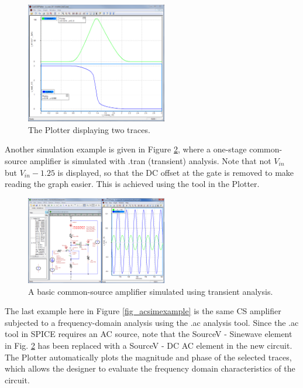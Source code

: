 \begin{figure}
    \includegraphics[width=0.55\textwidth]{./figures/getting_started_figures/Plotter_twotraces.png}
    \caption{The Plotter displaying two traces.}
  \label{fig_plotter_bothtraces}
\end{figure} 

Another simulation example is given in Figure \ref{fig_transientsimexample}, where a one-stage common-source amplifier is simulated with \textsf{.tran} (transient) analysis.  Note that not $V_{in}$ but $V_{in}-1.25$ is displayed, so that the DC offset at the gate is removed to make reading the graph easier.  This is achieved using the  tool in the Plotter.

\begin{figure}[hbt]
\centering
  \includegraphics[width=0.55\textwidth]
	{./figures/getting_started_figures/CoolSPICE_examplesimulation_transient.png}
  \caption{A basic common-source amplifier simulated using transient analysis.}
  \label{fig_transientsimexample}
\end{figure}

The last example here in Figure \ref{fig_acsimexample} is the same CS amplifier subjected to a frequency-domain analysis using the \textsf{.ac} analysis tool.  Since the \textsf{.ac} tool in SPICE requires an AC source, note that the \textsf{SourceV - Sinewave} element in Fig. \ref{fig_transientsimexample} has been replaced with a \textsf{SourceV - DC AC} element in the new circuit.  The Plotter automatically plots the magnitude and phase of the selected traces, which allows the designer to evaluate the frequency domain characteristics of the circuit.

